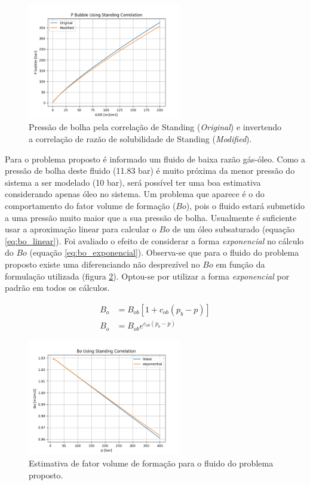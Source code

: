 \documentclass[final,3p]{elsarticle}
\numberwithin{equation}{section}
\begin{document}
        \begin{figure}
            \centering
            \includegraphics[width=0.6\textwidth]{pvt/p_bubble.png}
            \caption{Pressão de bolha pela correlação de Standing (\emph{Original}) e invertendo a correlação de razão de solubilidade de Standing (\emph{Modified}).}
            \label{fig:pb}
        \end{figure}

        Para o problema proposto é informado um fluido de baixa razão gás-óleo. Como a pressão de bolha deste fluido (11.83 bar) é muito próxima da menor pressão do sistema a ser modelado (10 bar), será possível ter uma boa estimativa considerando apenas óleo no sistema. Um problema que aparece é o do comportamento do fator volume de formação ($Bo$), pois o fluido estará submetido a uma pressão muito maior que a sua pressão de bolha. Usualmente é suficiente usar a aproximação linear para calcular o $Bo$ de um óleo subsaturado (equação \ref{eq:bo_linear}). Foi avaliado o efeito de considerar a forma \emph{exponencial} no cálculo do $Bo$ (equação \ref{eq:bo_exponencial}). Observa-se que para o fluido do problema proposto existe uma diferenciando não desprezível no $Bo$ em função da formulação utilizada (figura \ref{fig:bo_problema_proposto}). Optou-se por utilizar a forma \emph{exponencial} por padrão em todos os cálculos.

        \begin{align}
          B_o &= B_{ob} [1 + c_{ob}(p_b-p)] \label{eq:bo_linear} \\
          B_o &= B_{ob} e^{c_{ob}(p_b-p)} \label{eq:bo_exponencial}
        \end{align}

        \begin{figure}
            \centering
            \includegraphics[width=0.6\textwidth]{pvt/bo2.png}
            \caption{Estimativa de fator volume de formação para o fluido do problema proposto.}
            \label{fig:bo_problema_proposto}
        \end{figure}
\end{document}
